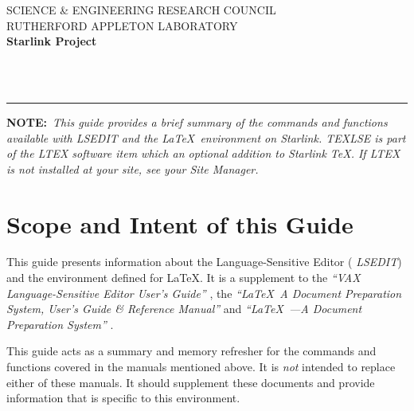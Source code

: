 \thispagestyle{empty}
SCIENCE \& ENGINEERING RESEARCH COUNCIL \hfill \stardocname\\
RUTHERFORD APPLETON LABORATORY\\
{\large\bf Starlink Project\\}
{\large\bf \stardoccategory\ \stardocnumber}
\begin{flushright}
\stardocauthors\\
\stardocdate
\end{flushright}
\vspace{-4mm}
\rule{\textwidth}{0.5mm}
\vspace{5mm}
\begin{center}
{\Large\bf \stardoctitle}
\end{center}
\vspace{5mm}

{\bf NOTE:}~{\em This guide provides a brief summary of the commands and
functions available with {\sl LSEDIT\/} and the \LaTeX\ environment on
Starlink. TEXLSE is part of the LTEX software item which an optional addition
to Starlink \TeX . If LTEX is not installed at your site, see your Site
Manager.}

\setlength{\parskip}{0mm}
\tableofcontents
\setlength{\parskip}{\medskipamount}
\markright{\stardocname}

\newpage

\section*{Scope and Intent of this Guide}

This guide presents information about the Language-Sensitive Editor ({\sl
LSEDIT\/}) and the environment defined for \LaTeX.  It is a supplement to the
{\em ``VAX Language-Sensitive Editor User's Guide''\/} \cite{lse}, the 
{\em ``\/\LaTeX\, A Document Preparation System, User's Guide \& Reference
Manual''\/} \cite{latex} and 
{\em ``\/\LaTeX\ ---A Document Preparation System'' \/} \cite{sun9}.

\bigskip

This guide acts as a summary and memory refresher for the commands and
functions covered in the manuals mentioned above. It is {\em not\/} intended to
replace either of these manuals.  It should supplement these documents and
provide information that is specific to this environment. 

